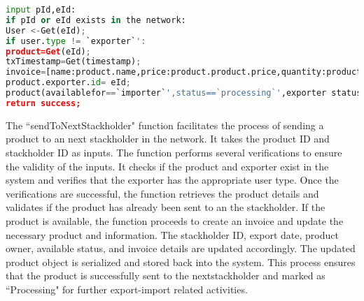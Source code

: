 \begin{lstlisting}[language=Python , caption=send to next stackholder]
input pId,eId:
if pId or eId exists in the network:
User <-Get(eId);
if user.type != `exporter`':
product=Get(eId);
txTimestamp=Get(timestamp);			 
invoice=[name:product.name,price:product.product.price,quantity:product.product.quantity]
product.exporter.id= eId;
product(availablefor==`importer`',status==`processing`',exporter status==`processing`');
return success;       
\end{lstlisting}
The ``sendToNextStackholder" function facilitates the process of sending a product to an next stackholder in the network. It takes the product ID and stackholder ID as inputs. The function performs several verifications to ensure the validity of the inputs. It checks if the product and exporter exist in the system and verifies that the exporter has the appropriate user type. Once the verifications are successful, the function retrieves the product details and validates if the product has already been sent to an the stackholder. If the product is available, the function proceeds to create an invoice and update the necessary product and information. The stackholder ID, export date, product owner, available status, and invoice details are updated accordingly. The updated product object is serialized and stored back into the system. This process ensures that the product is successfully sent to the nextstackholder and marked as ``Processing" for further export-import related activities.